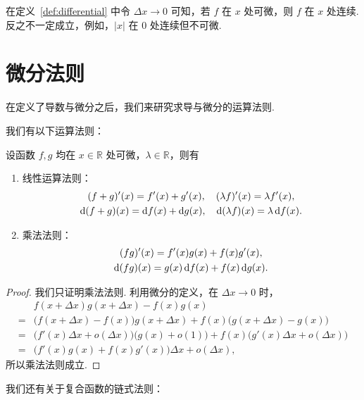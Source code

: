 \documentclass[../main.tex]{subfiles}
\begin{document}
在定义~\ref{def:differential} 中令 $\Delta x \to 0$ 可知，若 $f$ 在 $x$ 处可微，则 $f$ 在 $x$ 处连续. 反之不一定成立，例如，$|x|$ 在 $0$ 处连续但不可微. 


\section{微分法则}

在定义了导数与微分之后，我们来研究求导与微分的运算法则. 

我们有以下运算法则：

\begin{proposition}[求导与微分的四则运算法则]
    设函数 $f, g$ 均在 $x \in \mathbb R$ 处可微，$\lambda \in \mathbb R$，则有
    \begin{enumerate}[label = (\alph*)]
        \item 线性运算法则：
        \begin{gather*}
            (f + g)'(x) = f'(x) + g'(x), \quad (\lambda f)'(x) = \lambda f'(x), \\
            \mathrm{d}(f + g)(x) = \mathrm{d} f(x) + \mathrm{d} g(x), \quad \mathrm{d}(\lambda f)(x) = \lambda \,\mathrm{d} f(x). 
        \end{gather*}

        \item 乘法法则：
        \begin{gather*}
            (fg)'(x) = f'(x) g(x) + f(x) g'(x),  \\
            \mathrm{d}(fg)(x) = g(x) \,\mathrm{d} f(x) + f(x) \,\mathrm{d} g(x). 
        \end{gather*}
    \end{enumerate}
\end{proposition}

\begin{proof}
    我们只证明乘法法则. 利用微分的定义，在 $\Delta x \to 0$ 时，
    \begin{align*}
        &f(x + \Delta x) g(x + \Delta x) - f(x) g(x) \\
        ={} & \big(f(x + \Delta x) - f(x)\big) g(x + \Delta x) + f(x) \big(g(x + \Delta x) - g(x)\big) \\
        ={} & \big(f'(x)\Delta x + o(\Delta x)\big) \big(g(x) + o(1)\big) + f(x) \big(g'(x)\Delta x + o(\Delta x)\big) \\
        ={} & \big(f'(x)g(x) + f(x)g'(x)\big) \Delta x + o(\Delta x), 
    \end{align*}
    所以乘法法则成立. 
\end{proof}

我们还有关于复合函数的链式法则：
\end{document}
